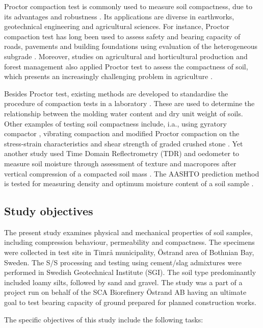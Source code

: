 \documentclass{amestyle}
\begin{document}
Proctor compaction test is commonly used to measure soil compactness, due to its advantages and robustness \cite{Wasman,Matteo,Boudlal}. Its applications are diverse in earthworks, geotechnical engineering and agricultural sciences. For instance, Proctor compaction test has long been used to assess safety and bearing capacity of roads, pavements and building foundations using evaluation of the heterogeneous subgrade \cite{Barden,Jibon}. Moreover, studies on agricultural and horticultural production and forest management also applied Proctor test to assess the compactness of soil, which presents an increasingly challenging problem in agriculture \cite{ARAGON2000197,Bayat,Nhantumbo,ALAOUI20111}. 

Besides Proctor test, existing methods are developed to standardise the procedure of compaction tests in a laboratory \cite{ASTM2007,ASTM2009}. These are used to determine the relationship between the molding water content and dry unit weight of soils. Other examples of testing soil compactness include, i.a., using gyratory compactor \cite{Leeetal2007}, vibrating compaction and modified Proctor compaction on the stress-strain characteristics and shear strength of graded crushed stone \cite{Long}. Yet another study used Time Domain Reflectrometry (TDR) and oedometer to measure soil moisture through assessment of texture and macropores after vertical compression of a compacted soil mass \cite{Alaoui}. The AASHTO prediction method is tested for measuring density and optimum moisture content of a soil sample \cite{Livneh}. 

\newpage
\subsection{Study objectives} 
The present study examines physical and mechanical properties of soil samples, including compression behaviour, permeability and compactness. The specimens were collected in test site in Timrå municipality, Östrand area of Bothnian Bay, Sweden. The S/S processing and testing using cement/slag admixtures were performed in Swedish Geotechnical Institute (SGI). The soil type predominantly included loamy silts, followed by sand and gravel. The study was a part of a project run on behalf of the SCA Biorefinery Östrand AB having an ultimate goal to test bearing capacity of ground prepared for planned construction works. 

The specific objectives of this study include the following tasks: 
\end{document}
